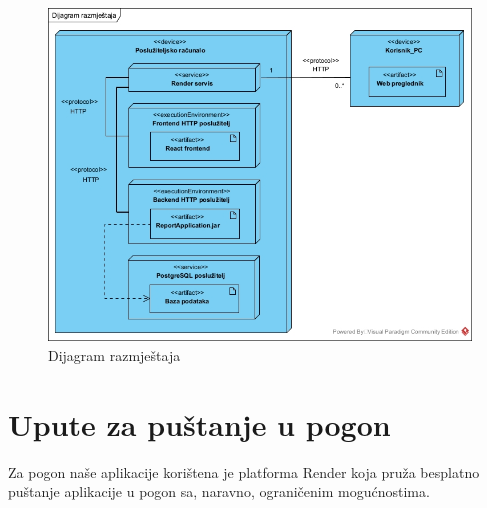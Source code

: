 			\begin{figure}[H]
				\includegraphics[scale=0.60]{slike/DR.jpg} %
				\centering
				\caption{Dijagram razmještaja}
				\label{fig:DijagramRazmjestaja}
			\end{figure}

			\eject 
		
			\section{Upute za puštanje u pogon}

			Za pogon naše aplikacije korištena je platforma Render koja pruža besplatno puštanje aplikacije u pogon sa, naravno, ograničenim mogućnostima.   

